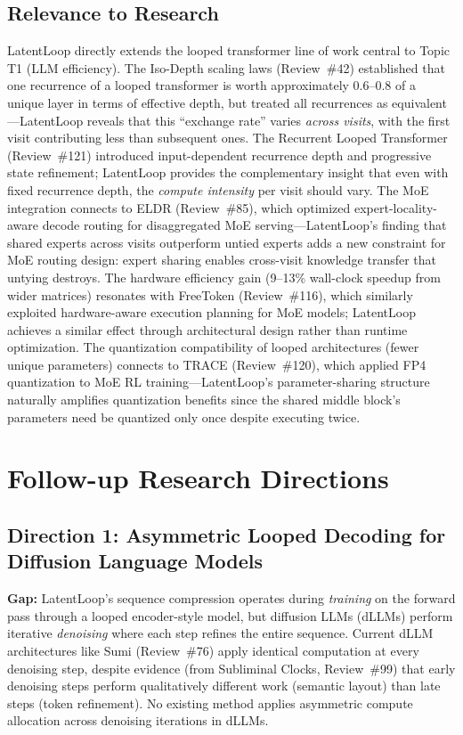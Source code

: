 \documentclass[11pt,a4paper]{article}
\begin{document}
\subsection{Relevance to Research}
LatentLoop directly extends the looped transformer line of work central to Topic T1 (LLM efficiency). The Iso-Depth scaling laws (Review~\#42) established that one recurrence of a looped transformer is worth approximately 0.6--0.8 of a unique layer in terms of effective depth, but treated all recurrences as equivalent---LatentLoop reveals that this ``exchange rate'' varies \emph{across visits}, with the first visit contributing less than subsequent ones. The Recurrent Looped Transformer (Review~\#121) introduced input-dependent recurrence depth and progressive state refinement; LatentLoop provides the complementary insight that even with fixed recurrence depth, the \emph{compute intensity} per visit should vary. The MoE integration connects to ELDR (Review~\#85), which optimized expert-locality-aware decode routing for disaggregated MoE serving---LatentLoop's finding that shared experts across visits outperform untied experts adds a new constraint for MoE routing design: expert sharing enables cross-visit knowledge transfer that untying destroys. The hardware efficiency gain (9--13\% wall-clock speedup from wider matrices) resonates with FreeToken (Review~\#116), which similarly exploited hardware-aware execution planning for MoE models; LatentLoop achieves a similar effect through architectural design rather than runtime optimization. The quantization compatibility of looped architectures (fewer unique parameters) connects to TRACE (Review~\#120), which applied FP4 quantization to MoE RL training---LatentLoop's parameter-sharing structure naturally amplifies quantization benefits since the shared middle block's parameters need be quantized only once despite executing twice.

\section{Follow-up Research Directions}

\subsection{Direction 1: Asymmetric Looped Decoding for Diffusion Language Models}
\textbf{Gap:} LatentLoop's sequence compression operates during \emph{training} on the forward pass through a looped encoder-style model, but diffusion LLMs (dLLMs) perform iterative \emph{denoising} where each step refines the entire sequence. Current dLLM architectures like Sumi (Review~\#76) apply identical computation at every denoising step, despite evidence (from Subliminal Clocks, Review~\#99) that early denoising steps perform qualitatively different work (semantic layout) than late steps (token refinement). No existing method applies asymmetric compute allocation across denoising iterations in dLLMs.
\end{document}
